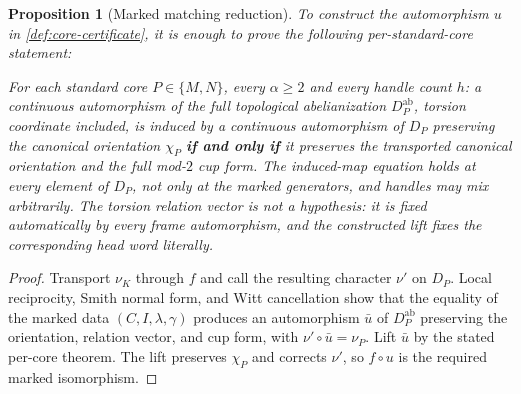 \documentclass[11pt,reqno]{amsart}
\newtheorem{proposition}[theorem]{Proposition}
\theoremstyle{remark}
\numberwithin{equation}{section}
\begin{document}
\begin{proposition}[Marked matching reduction]\label{prop:marked-reduction}
To construct the automorphism \(u\) in
\cref{def:core-certificate}, it is enough to prove the following
per-standard-core statement:

\smallskip
\emph{For each standard core \(P\in\{M,N\}\), every \(\alpha\ge2\) and every
handle count \(h\): a continuous automorphism of the full topological
abelianization \(D_P^{\mathrm{ab}}\), torsion coordinate included, is induced by
a continuous automorphism of \(D_P\) preserving the canonical orientation
\(\chi_P\) \textbf{if and only if} it preserves the transported canonical
orientation and the full mod-\(2\) cup form.  The induced-map equation holds at
every element of \(D_P\), not only at the marked generators, and handles may mix
arbitrarily.  The torsion relation vector is not a hypothesis: it is fixed
automatically by every frame automorphism, and the constructed lift fixes the
corresponding head word literally.}
\end{proposition}

\begin{proof}
Transport \(\nu_K\) through \(f\) and call the resulting character
\(\nu'\) on \(D_P\).  Local reciprocity, Smith normal form, and Witt
cancellation show that the equality of the marked data
\((C,I,\lambda,\gamma)\) produces an automorphism \(\bar u\) of
\(D_P^{\mathrm{ab}}\) preserving the orientation, relation vector, and
cup form, with \(\nu'\circ\bar u=\nu_P\).  Lift \(\bar u\) by the stated
per-core theorem.  The lift preserves \(\chi_P\) and corrects \(\nu'\), so
\(f\circ u\) is the required marked isomorphism.
\end{proof}
\end{document}
